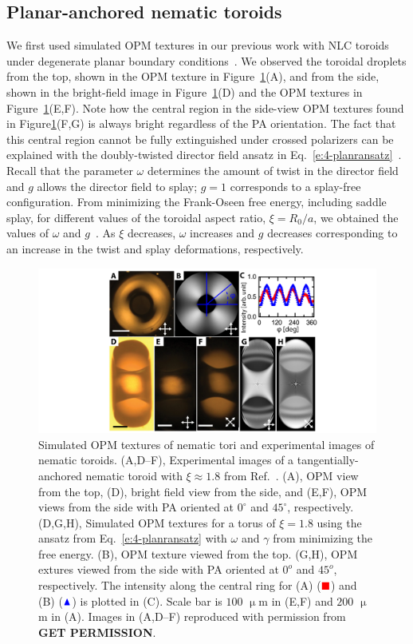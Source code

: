 \subsection{Planar-anchored nematic toroids}
We first used simulated OPM textures in our previous work with NLC toroids under degenerate planar boundary conditions~\cite{RN46}.
We observed the toroidal droplets from the top, shown in the OPM texture in Figure~\ref{f:4-PlanarTorusComparison}(A), and from the side, shown in the bright-field image in Figure~\ref{f:4-PlanarTorusComparison}(D) and the OPM textures in Figure~\ref{f:4-PlanarTorusComparison}(E,F).
Note how the central region in the side-view OPM textures found in Figure\ref{f:4-PlanarTorusComparison}(F,G) is always bright regardless of the PA orientation.
The fact that this central region cannot be fully extinguished under crossed polarizers can be explained with the doubly-twisted director field ansatz in Eq.~\ref{e:4-planransatz}~\cite{RN46}.
Recall that the parameter $\omega$ determines the amount of twist in the director field and $g$ allows the director field to splay; $g=1$ corresponds to a splay-free configuration.
From minimizing the Frank-Oseen free energy, including saddle splay, for different values of the toroidal aspect ratio, $\xi = R_0/a$, we obtained the values of $\omega$ and $g$~\cite{RN46}.
As $\xi$ decreases, $\omega$ increases and $g$ decreases corresponding to an increase in the twist and splay deformations, respectively.
\begin{figure}
\centering
\includegraphics{figures/C4/Ch4-Figs_PlanarToroids.png}
\caption{Simulated OPM textures of nematic tori and experimental images of nematic toroids. (A,D--F), Experimental images of a tangentially-anchored nematic toroid with $\xi \approx 1.8$ from Ref.~\cite{RN46}.
(A), OPM view from the top, (D), bright field view from the side, and (E,F), OPM views from the side with PA oriented at $0^{\circ}$ and $45^{\circ}$, respectively.
(D,G,H), Simulated OPM textures for a torus of $\xi = 1.8$ using the ansatz from Eq.~\ref{e:4-planransatz} with $\omega$ and $\gamma$ from minimizing the free energy.
(B), OPM texture viewed from the top.
(G,H), OPM extures viewed from the side with PA oriented at $0^o$ and $45^o$, respectively.
The intensity along the central ring for (A) ($\color{red}\blacksquare$) and (B) ($\color{blue}\blacktriangle$) is plotted in (C).
Scale bar is $100$ $\upmu$m in (E,F) and $200$ $\upmu$m in (A).
Images in (A,D--F) reproduced with permission from {\bf GET PERMISSION}.}\label{f:4-PlanarTorusComparison}
\end{figure}

